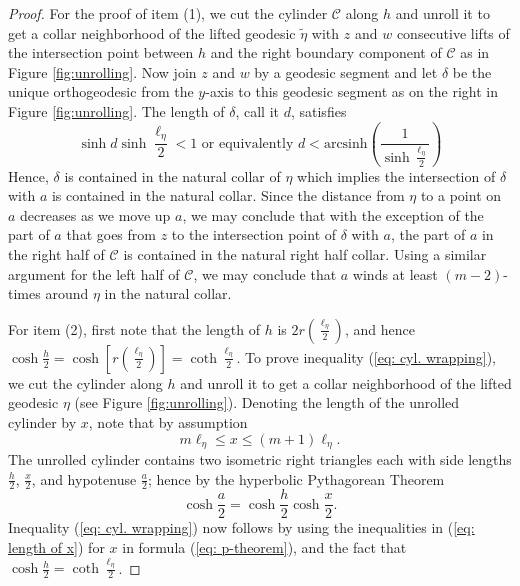 \documentclass[12pt]{amsart}
\numberwithin{equation}{section}
\theoremstyle{plain}
\begin{document}
\begin{proof}
For the proof of item (1), 
we cut the cylinder $\mathcal{C}$ along $h$ and unroll it to get a
collar neighborhood of the lifted geodesic $\tilde{\eta}$ with $z$ and $w$ consecutive lifts of the intersection point between $h$ and  the right boundary component of $\mathcal{C}$ as in Figure
\ref{fig:unrolling}.
Now join $z$ and $w$ by a geodesic segment and let  $\delta$ be the unique orthogeodesic from the $y$-axis to this geodesic segment as on the right in Figure \ref{fig:unrolling}. The length of $\delta$, call it $d$, satisfies
$$\sinh d \sinh \frac{\ell_{\eta}}{2}<1
\text{  or equivalently } 
d < 
\text{arcsinh} \left(\frac{1}{\sinh \frac{\ell_{\eta}}{2}}\right)
$$
Hence, $\delta$ is contained in the natural collar of $\eta$ which implies the intersection of 
$\delta$ with $a$ is contained in the natural collar. Since the distance from  $\eta$ to a point on $a$ decreases as we move up  $a$,
we may conclude that with the exception of the part of $a$ that goes from $z$ to the intersection point of $\delta$ with $a$, the part of $a$ in the right half of 
$\mathcal{C}$ is contained in the natural right half collar.  Using a similar argument  for the left half of  $\mathcal{C}$, we may conclude that $a$ winds at least $(m-2)$-times around $\eta$ in the natural collar. 


For item (2),
 first note that the length of $h$ is 
$2 r\left(\frac{\ell_{\eta}}{2}\right)$, and hence 
 $\cosh \frac{h}{2} =\cosh \left[r \left(\frac{\ell_{\eta}}{2} \right)\right]
=\coth \frac{\ell_{\eta}}{2}$. 
To prove  inequality (\ref{eq: cyl. wrapping}), we cut the cylinder along $h$ and unroll it 
to get a collar neighborhood of the lifted geodesic $\eta$ (see Figure \ref{fig:unrolling}). Denoting  the length of the unrolled cylinder by $x$,  note that by assumption 
\begin{equation}\label{eq: length of x}
m \ell_{\eta}  \leq x \leq (m+1)\ell_{\eta}.
\end{equation}
The unrolled cylinder contains  two isometric right triangles each with side lengths $\frac{h}{2}$, $\frac{x}{2}$, and hypotenuse $\frac{a}{2}$; hence by the hyperbolic Pythagorean Theorem
\begin{equation} \label{eq: p-theorem}
\cosh \frac{a}{2} =\cosh \frac{h}{2} \cosh \frac{x}{2}.
\end{equation}
Inequality (\ref{eq: cyl. wrapping}) now  follows by   using the inequalities in 
(\ref{eq: length of x})   for  $x$  in 
formula  (\ref{eq: p-theorem}),  and the fact that 
  $\cosh \frac{h}{2} =\coth \frac{\ell_{\eta}}{2}$.
\end{proof}
\end{document}

